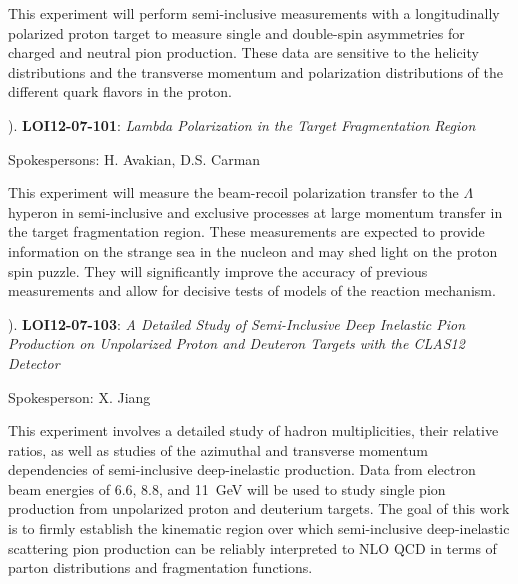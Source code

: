 \begin{small}
\vskip 0.2cm

This experiment will perform semi-inclusive measurements with a 
longitudinally polarized proton target to measure single and 
double-spin asymmetries for charged and neutral pion production.  These
data are sensitive to the helicity distributions and the transverse
momentum and polarization distributions of the different quark
flavors in the proton.

\vskip 0.3cm

). {\bf LOI12-07-101}: {\it Lambda Polarization in the Target
Fragmentation Region}

\vskip 0.2cm

\begin{footnotesize}
Spokespersons: H. Avakian, D.S. Carman
\end{footnotesize}

\vskip 0.2cm

This experiment will measure the beam-recoil polarization transfer
to the $\Lambda$ hyperon in semi-inclusive and exclusive processes
at large momentum transfer in the target fragmentation region.  These 
measurements are expected to provide information on the strange sea 
in the nucleon and may shed light on the proton spin puzzle.  They
will significantly improve the accuracy of previous measurements
and allow for decisive tests of models of the reaction mechanism.

\vskip 0.3cm

). {\bf LOI12-07-103}: {\it A Detailed Study of Semi-Inclusive Deep
Inelastic Pion Production on Unpolarized Proton and Deuteron Targets
with the CLAS12 Detector}

\vskip 0.2cm

\begin{footnotesize}
Spokesperson: X. Jiang
\end{footnotesize}

\vskip 0.2cm

This experiment involves a detailed study of hadron multiplicities,
their relative ratios, as well as studies of the azimuthal and transverse
momentum dependencies of semi-inclusive deep-inelastic production.
Data from electron beam energies of 6.6, 8.8, and 11~GeV will be used
to study single pion production from unpolarized proton and deuterium
targets.  The goal of this work is to firmly establish the kinematic
region over which semi-inclusive deep-inelastic scattering pion production
can be reliably interpreted to NLO QCD in terms of parton distributions and 
fragmentation functions.
\end{small}

